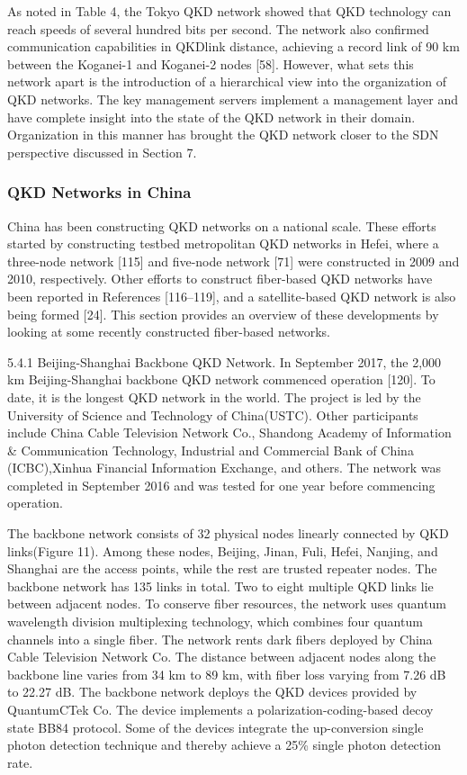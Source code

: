 As noted in Table 4, the Tokyo QKD network showed that QKD technology can reach speeds of several hundred bits per second. The network also confirmed communication capabilities in QKDlink distance, achieving a record link of 90 km between the Koganei-1 and Koganei-2 nodes [58]. However, what sets this network apart is the introduction of a hierarchical view into the organization of QKD networks. The key management servers implement a management layer and have complete insight into the state of the QKD network in their domain. Organization in this manner has brought the QKD network closer to the SDN perspective discussed in Section 7.

\subsubsection*{QKD Networks in China}
China has been constructing QKD networks on a national scale. These efforts started by constructing testbed metropolitan QKD networks in Hefei, where a three-node network [115] and five-node network [71] were constructed in 2009 and 2010, respectively. Other efforts to construct fiber-based QKD networks have been reported in References [116–119], and a satellite-based QKD network is also being formed [24]. This section provides an overview of these developments by looking at some recently constructed fiber-based networks.

5.4.1 Beijing-Shanghai Backbone QKD Network. In September 2017, the 2,000 km Beijing-Shanghai backbone QKD network commenced operation [120]. To date, it is the longest QKD network in the world. The project is led by the University of Science and Technology of China(USTC). Other participants include China Cable Television Network Co., Shandong Academy of Information \& Communication Technology, Industrial and Commercial Bank of China (ICBC),Xinhua Financial Information Exchange, and others. The network was completed in September 2016 and was tested for one year before commencing operation.

The backbone network consists of 32 physical nodes linearly connected by QKD links(Figure 11). Among these nodes, Beijing, Jinan, Fuli, Hefei, Nanjing, and Shanghai are the access points, while the rest are trusted repeater nodes. The backbone network has 135 links in total.
Two to eight multiple QKD links lie between adjacent nodes. To conserve fiber resources, the network uses quantum wavelength division multiplexing technology, which combines four quantum channels into a single fiber. The network rents dark fibers deployed by China Cable Television Network Co. The distance between adjacent nodes along the backbone line varies from 34 km to
89 km, with fiber loss varying from 7.26 dB to 22.27 dB.
The backbone network deploys the QKD devices provided by QuantumCTek Co. The device implements a polarization-coding-based decoy state BB84 protocol. Some of the devices integrate the up-conversion single photon detection technique and thereby achieve a 25\% single photon detection rate.

